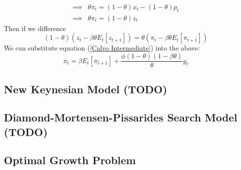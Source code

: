 \documentclass[12pt]{article}
\begin{document}
\begin{itemize}
\[\begin{split}
        \implies &\theta \pi_t = (1-\theta)x_t - (1-\theta)p_t \\
        \implies &\theta \pi_t = (1-\theta)z_t
    \end{split}\]
    Then if we difference
    \[(1-\theta)(z_t -\beta\theta E_t[z_{t+1}])= \theta(\pi_t - \beta\theta E_t[\pi_{t+1}])\]
    We can substitute equation (\ref{Calvo Intermediate}) into the above:
    \begin{equation}\label{Calvo Phillips Curve}
    \pi_t = \beta E_t[\pi_{t+1}] + \frac{\phi(1-\theta)(1-\beta\theta)}{\theta} y_t
    \end{equation}
\end{itemize}

\subsection{New Keynesian Model (TODO)}

\subsection{Diamond-Mortensen-Pissarides Search Model (TODO)}

\subsection{Optimal Growth Problem}
\end{document}
